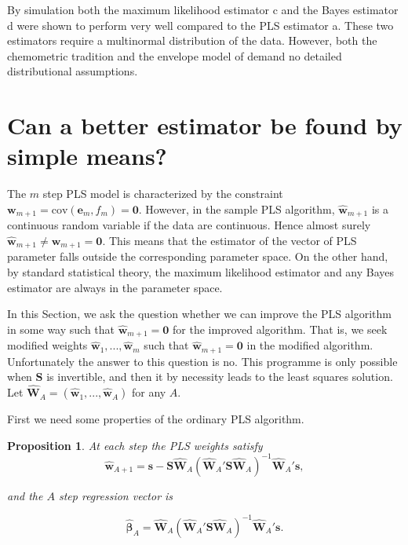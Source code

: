 \documentclass[a4paper, 11pt]{article}
\newtheorem{proposition}{Proposition} \theoremstyle{remark}
\begin{document}
By simulation both the maximum likelihood estimator c and the Bayes estimator d were shown to perform very well compared to the PLS estimator a. These two estimators require a multinormal distribution of the data. However, both the chemometric tradition and the envelope model of \citet{cook2010envelope, cook2013envelopes} demand no detailed distributional assumptions.

\section{Can a better estimator be found by simple means?}

The $m$ step PLS model is characterized by the constraint $\bm{w}_{m+1}=\mathrm{cov}(\bm{e}_m ,f_m)=\bm{0}$. However, in the sample PLS algorithm, $\widehat{\bm{w}}_{m+1}$ is a continuous random variable if the data are continuous. Hence almost surely $\widehat{\bm{w}}_{m+1}\ne\bm{w}_{m+1}=\bm{0}$. This means that the estimator of the vector of PLS parameter falls outside the corresponding parameter space. On the other hand, by standard statistical theory, the maximum likelihood estimator and any Bayes estimator are always in the parameter space.

In this Section, we ask the question whether we can improve the PLS algorithm in some way such that $\widehat{\bm{w}}_{m+1}=\bm{0}$ for the improved algorithm. That is, we seek modified weights $\widehat{\bm{w}}_{1},...,\widehat{\bm{w}}_{m}$ such that $\widehat{\bm{w}}_{m+1}=\bm{0}$ in the modified algorithm. Unfortunately the answer to this question is no. This programme is only possible when $\bm{S}$ is invertible, and then it by necessity leads to the least squares solution. Let $\widehat{\bm{W}}_A=(\widehat{\bm{w}}_1,...,\widehat{\bm{w}}_A)$ for any $A$.

First we need some properties of the ordinary PLS algorithm.
\bigskip

\begin{proposition}
  At each step the PLS weights satisfy
  \begin{equation}
    \widehat{\bm{w}}_{A+1} =
    \bm{s}-\bm{S}\widehat{\bm{W}}_{A}
    (\widehat{\bm{W}}_{A}'\bm{S}\widehat{\bm{W}}_{A})^{-1}
    \widehat{\bm{W}}_{A}'\bm{s},
    \label{weight}
  \end{equation}

and the $A$ step regression vector is

\begin{equation}
  \widehat{\bm{\beta}}_{A} =
  \widehat{\bm{W}}_{A}
  (\widehat{\bm{W}}_{A}'\bm{S}\widehat{\bm{W}}_{A})^{-1}
  \widehat{\bm{W}}_{A}'\bm{s}.
  \label{regression}
\end{equation}
\end{proposition}
\end{document}

